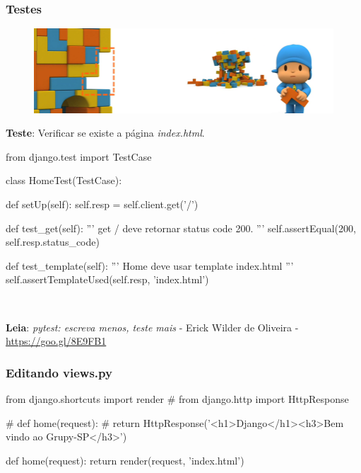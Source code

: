 \documentclass[aspectratio=169]{beamer}
\begin{document}
\begin{frame}\frametitle{Testes}

	\begin{figure}[h]
	  \centering
  		\includegraphics[width=.9\paperwidth]{img/teste03.png}
	\end{figure}

\end{frame}

\begin{frame}[fragile]

\textbf{Teste}: Verificar se existe a p\'agina \textit{index.html}.

\begin{pythoncode}
	from django.test import TestCase

	class HomeTest(TestCase):

	    def setUp(self):
	        self.resp = self.client.get('/')

	    def test_get(self):
	        ''' get / deve retornar status code 200. '''
	        self.assertEqual(200, self.resp.status_code)

	    def test_template(self):
	        ''' Home deve usar template index.html '''
	        self.assertTemplateUsed(self.resp, 'index.html')
\end{pythoncode}

\

\textbf{Leia}: \textit{pytest: escreva menos, teste mais} - Erick Wilder de Oliveira - \url{https://goo.gl/8E9FB1} 

\end{frame}

\begin{frame}[fragile]\frametitle{Editando views.py}

\begin{pythoncode}
	from django.shortcuts import render
	# from django.http import HttpResponse

	# def home(request):
	#     return HttpResponse('<h1>Django</h1><h3>Bem vindo ao Grupy-SP</h3>')

	def home(request):
	    return render(request, 'index.html')
\end{pythoncode}

\end{frame}
\end{document}
